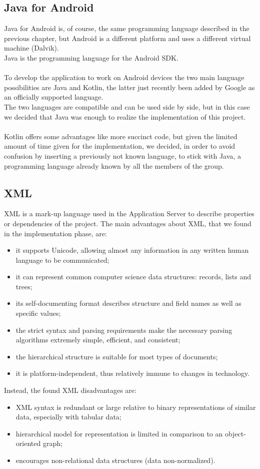 \subsection{Java for Android}
\label{subsect:Java for Android}
Java for Android is, of course, the same programming language described in the previous chapter, but Android is a different platform and uses a different virtual machine (Dalvik). \\
Java is the programming language for the Android SDK. \\\\
To develop the application to work on Android devices the two main language possibilities are Java and Kotlin, the latter just recently been added by Google as an officially supported language.\\
The two languages are compatible and can be used side by side, but in this case we decided that Java was enough to realize the implementation of this project.\\\\
Kotlin offers some advantages like more succinct code, but given the limited amount of time given for the implementation, we decided, in order to avoid confusion by inserting a previously not known language, to stick with Java, a programming language already known by all the members of the group.
\subsection{XML}
\label{subsect:XML}
XML is a mark-up language used in the Application Server to describe properties or dependencies of the project. The main advantages about XML, that we found in the implementation phase, are:
\begin{itemize}
\item it supports Unicode, allowing almost any information in any written human language to be communicated;
\item it can represent common computer science data structures: records, lists and trees;
\item its self-documenting format describes structure and field names as well as specific values;
\item the strict syntax and parsing requirements make the necessary parsing algorithms extremely simple, efficient, and consistent;
\item the hierarchical structure is suitable for most types of documents;
\item it is platform-independent, thus relatively immune to changes in technology.
\end{itemize}
Instead, the found XML disadvantages are:
\begin{itemize}
\item XML syntax is redundant or large relative to binary representations of similar data, especially with tabular data;
\item hierarchical model for representation is limited in comparison to an object-oriented graph;
\item encourages non-relational data structures (data non-normalized).
\end{itemize}
